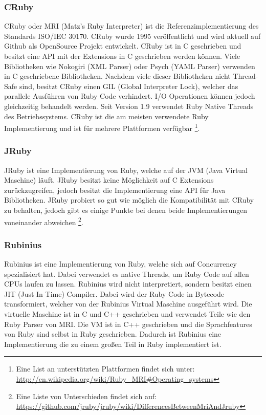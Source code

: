 \subsubsection{CRuby}
CRuby oder MRI (Matz's Ruby Interpreter) ist die Referenzimplementierung des Standards ISO/IEC 30170. CRuby wurde 1995 veröffentlicht und wird aktuell auf Github als OpenSource Projekt entwickelt. CRuby ist in C geschrieben und besitzt eine API mit der Extensions in C geschrieben werden können. Viele Bibliotheken wie Nokogiri (XML Parser) oder Psych (YAML Parser) verwenden in C geschriebene Bibliotheken. Nachdem viele dieser Bibliotheken nicht Thread-Safe sind, besitzt CRuby einen GIL (Global Interpreter Lock), welcher das parallele Ausführen von Ruby Code verhindert. I/O Operationen können jedoch gleichzeitig behandelt werden. Seit Version 1.9 verwendet Ruby Native Threads des Betriebssystems. CRuby ist die am meisten verwendete Ruby Implementierung und ist für mehrere Plattformen verfügbar \footnote{Eine List an unterstützten Plattformen findet sich unter: \url{http://en.wikipedia.org/wiki/Ruby_MRI#Operating_systems}}.

\subsubsection{JRuby}

JRuby ist eine Implementierung von Ruby, welche auf der JVM (Java Virtual Maschine) läuft. JRuby besitzt keine Möglichkeit auf C Extensions zurückzugreifen, jedoch besitzt die Implementierung eine API für Java Bibliotheken. JRuby probiert so gut wie möglich die Kompatibilität mit CRuby zu behalten, jedoch gibt es einige Punkte bei denen beide Implementierungen voneinander abweichen \footnote{Eine Liste von Unterschieden findet sich auf: \url{https://github.com/jruby/jruby/wiki/DifferencesBetweenMriAndJruby}}. 

\subsubsection{Rubinius}
Rubinius ist eine Implementierung von Ruby, welche sich auf Concurrency spezialisiert hat. Dabei verwendet es native Threads, um Ruby Code auf allen CPUs laufen zu lassen. Rubinius wird nicht interpretiert, sondern besitzt einen JIT (Just In Time) Compiler. Dabei wird der Ruby Code in Bytecode transformiert, welcher von der Rubinius Virtual Maschine ausgeführt wird. Die virtuelle Maschine ist in C und C++ geschrieben und verwendet Teile wie den Ruby Parser von MRI. Die VM ist in C++ geschrieben und die Sprachfeatures von Ruby sind selbst in Ruby geschrieben. Dadurch ist Rubinius eine Implementierung die zu einem großen Teil in Ruby implementiert ist. 

